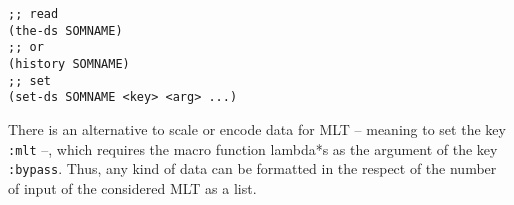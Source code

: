 \begin{lstlisting}[language=N3]
;; read
(the-ds SOMNAME)
;; or
(history SOMNAME)
;; set
(set-ds SOMNAME <key> <arg> ...)
\end{lstlisting}

\bigskip

There is an alternative to scale or encode data for MLT -- meaning to set the key \texttt{:mlt} --, which requires the macro function \glspl{lambda*} as the argument of the key \texttt{:bypass}. Thus, any kind of data can be formatted in the respect of the number of input of the considered MLT as a list.  


